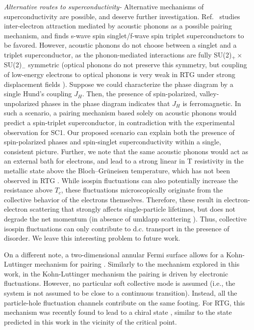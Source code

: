 \documentclass[aps,pra,twocolumn,superscriptaddress,10pt,article,nofootinbib,showpacs,longbibliography]{revtex4-1}
\begin{document}
\emph{Alternative routes to superconductivity-}
Alternative mechanisms of superconductivity are possible, and deserve further investigation.
Ref.~ studies inter-electron attraction mediated by acoustic phonons as a possible pairing mechanism, and finds s-wave spin singlet/f-wave spin triplet superconductors to be favored. 
However, acoustic phonons do not choose between a singlet and a triplet superconductor, as the phonon-mediated interactions are fully SU(2)$_+\times$SU(2)$_-$ symmetric (optical phonons do not preserve this symmetry, but coupling of low-energy electrons to optical phonons is very weak in RTG under strong displacement fields \cite{DaChuan2022}).
Suppose we could characterize the phase diagram by a single Hund's coupling $J_H$.
Then, the presence of spin-polarized, valley-unpolarized phases in the phase diagram indicates that $J_H$ is ferromagnetic.
In such a scenario, a pairing mechanism based solely on acoustic phonons would predict a spin-triplet superconductor, in contradiction with the experimental observation for SC1. 
Our proposed scenario can explain both the presence of spin-polarized phases and spin-singlet superconductivity within a single, consistent picture.
Further, we note that the same acoustic phonons would act as an external bath for electrons, and lead to a strong linear in T resistivity in the metallic state above the Bloch–Grüneisen temperature, which has not been observed in RTG \cite{Zhou_ABCSC}.
While isospin fluctuations can also potentially increase the resistance above $T_c$, these fluctuations microscopically originate from the collective behavior of the electrons themselves.
Therefore, these result in electron-electron scattering that strongly affects single-particle lifetimes, but does not degrade the net momentum (in absence of umklapp scattering \cite{ZimanBook}). 
Thus, collective isospin fluctuations can only contribute to d.c. transport in the presence of disorder. 
We leave this interesting problem to future work.

On a different note, a two-dimensional annular Fermi surface allows for a Kohn-Luttinger mechanism for pairing \cite{KL1965,Baranov1992,Maiti2013,Raghu2011,Chubukov2017}. 
Similarly to the mechanism explored in this work, in the Kohn-Luttinger mechanism the pairing is driven by electronic fluctuations. However, no particular soft collective mode is assumed (i.e., the system is not assumed to be close to a continuous transition). Instead, all the particle-hole fluctuation channels contribute on the same footing. For RTG, this mechanism was recently found to lead to a chiral state \cite{Ghazaryan}, similar to the state predicted in this work in the vicinity of the critical point.  
\end{document}
